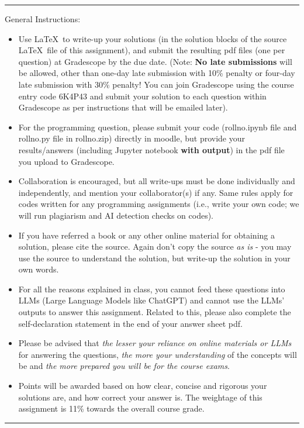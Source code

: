 \documentclass[solution,addpoints,12pt]{exam}
\begin{document}
\vspace{3mm}
\hrule
\vspace{0.5mm}
General Instructions: 
{\small 
\begin{itemize}
\item Use \LaTeX\ to write-up your solutions (in the solution blocks of the source \LaTeX\ file of this assignment), and submit the resulting pdf files (one per question) at Gradescope by the due date. (Note: {\bf No late submissions} will be allowed, other than one-day late submission with 10\% penalty or four-day late submission with 30\% penalty! You can join Gradescope using the course entry code 6K4P43 and submit your solution to each question within Gradescope as per instructions that will be emailed later).
\item For the programming question, please submit your code (rollno.ipynb file and rollno.py file in rollno.zip) directly in moodle, but provide your results/answers (including Jupyter notebook {\bf with output}) in the pdf file you upload to Gradescope.
\item Collaboration is encouraged, but all write-ups must be done individually and independently, and mention your collaborator(s) if any. Same rules apply for codes written for any programming assignments (i.e., write your own code; we will run plagiarism and AI detection checks on codes).
\item  If you have referred a book or any other online material for obtaining a solution, please cite the source. Again don't copy the source {\it as is} - you may use the source to understand the solution, but write-up the solution in your own words.   
\item For all the reasons explained in class, you cannot feed these questions into LLMs (Large Language Models like ChatGPT) and cannot use the LLMs' outputs to answer this assignment. Related to this, please also complete the self-declaration statement in the end of your answer sheet pdf. 
\item Please be advised that {\it the lesser your reliance on online materials or LLMs} for answering the questions, {\it the more your understanding} of the concepts will be and {\it the more prepared you will be for the course exams}.
\item Points will be awarded based on how clear, concise and rigorous your solutions are, and how correct your answer is. The weightage of this assignment is 11\% towards the overall course grade. 
\end{itemize}
}
\hrule
\end{document}
